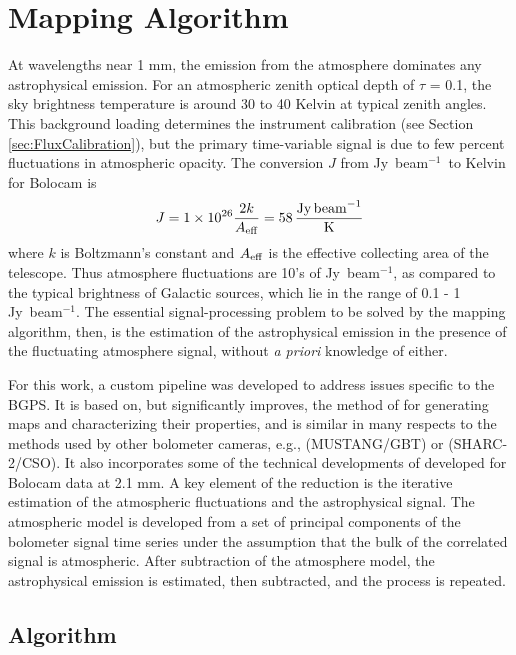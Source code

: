 \documentclass[12pt,preprint]{aastex}
\newcommand\jyb{Jy~beam$^{-1}$}
\begin{document}
\section{Mapping Algorithm}
\label{sec:Mapping}

At wavelengths near 1 mm, the emission from the atmosphere dominates
any astrophysical emission.  For an atmospheric zenith optical depth
of $\tau$ = 0.1, the sky brightness temperature is around 30 to 40
Kelvin at typical zenith angles.  This background loading determines
the instrument calibration (see Section \ref{sec:FluxCalibration}),
but the primary time-variable signal is due to few percent
fluctuations in atmospheric opacity.  The conversion $J$ from \jyb\
to Kelvin for Bolocam is
\begin{equation} 
\label{eq:JyPerK}
J = 1\times10^{26} \frac{2k}{A_{\rm eff}} = 
58 \, {\rm \frac{{\rm Jy\,beam}^{-1}}{{\rm K}}}
\end{equation}
where $k$ is Boltzmann's constant and $A_{\rm eff}$ is the effective
collecting area of the telescope.  Thus atmosphere fluctuations are
10's of \jyb, as compared to the typical brightness of Galactic
sources, which lie in the range of 0.1 - 1 \jyb.  The essential
signal-processing problem to be solved by the mapping algorithm, then,
is the estimation of the astrophysical emission in the presence of the
fluctuating atmosphere signal, without {\it a priori} knowledge of
either.

For this work, a custom pipeline was developed to address issues
specific to the BGPS.  It is based on, but significantly improves, the
method of \citet{enoch06} for generating maps and characterizing their
properties, and is similar in many respects to the methods used by
other bolometer cameras, {e.g.}, \citet{cotton09} (MUSTANG/GBT) or
\citet{kovacs08} (SHARC-2/CSO).  It also incorporates some of the
technical developments of \citet{sayers09} developed for Bolocam data
at 2.1 mm.  A key element of the reduction is the iterative estimation
of the atmospheric fluctuations and the astrophysical signal.  The
atmospheric model is developed from a set of principal components of
the bolometer signal time series under the assumption that the bulk of
the correlated signal is atmospheric.  After subtraction of the
atmosphere model, the astrophysical emission is estimated, then
subtracted, and the process is repeated.

\subsection{Algorithm}
\end{document}
